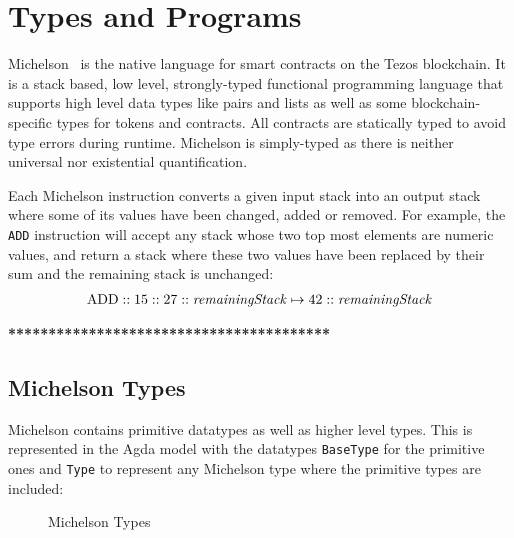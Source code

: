 \section{Types and Programs}\label{sec:Mtype}


Michelson~\cite{Mref,devres} is the native language for smart contracts on the Tezos blockchain.
It is a stack based, low level, strongly-typed functional programming language
that supports high level data types like pairs and lists as well as
some blockchain-specific types for tokens and contracts.
All contracts are statically typed
to avoid type errors during runtime.
Michelson is simply-typed as there is neither universal nor
existential quantification.

Each Michelson instruction converts a given input stack into an output stack
where some of its values have been changed, added or removed.
For example, the \verb=ADD= instruction will accept any stack
whose two top most elements are numeric values,
and return a stack where these two values have been replaced by their sum
and the remaining stack is unchanged:
\begin{align*}
	\text{ADD} :: 15 :: 27 :: \text{\emph{remainingStack}}
	\mapsto	           42 :: \text{\emph{remainingStack}}
\label{equ:ADD}
\end{align*}

\textbf{****************************************}

\subsection{Michelson Types}

Michelson contains primitive datatypes as well as higher level types.
This is represented in the Agda model with the datatypes \verb/BaseType/ for the primitive ones
and \verb/Type/ to represent any Michelson type where the primitive types are included:

\begin{figure}[tp]
\TypesType
%
\caption{Michelson Types}
\label{Type}
\end{figure}

